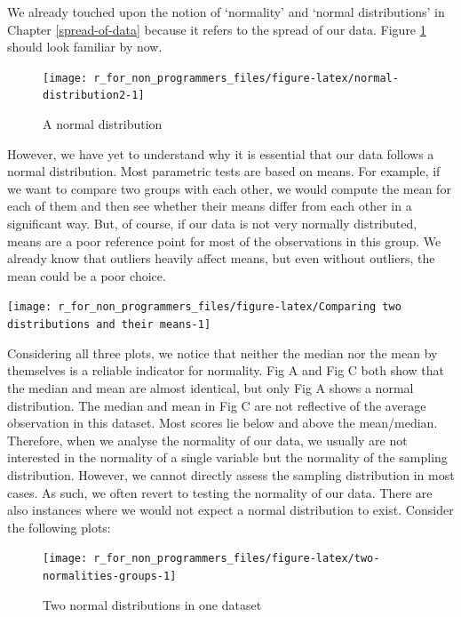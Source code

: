 \documentclass[
]{book}
\begin{document}
We already touched upon the notion of `normality' and `normal distributions' in Chapter \ref{spread-of-data} because it refers to the spread of our data. Figure \ref{fig:normal-distribution2} should look familiar by now.

\begin{figure}

{\centering \texttt{[image: r\_for\_non\_programmers\_files/figure-latex/normal-distribution2-1]} 

}

\caption{A normal distribution}\label{fig:normal-distribution2}
\end{figure}

However, we have yet to understand why it is essential that our data follows a normal distribution. Most parametric tests are based on means. For example, if we want to compare two groups with each other, we would compute the mean for each of them and then see whether their means differ from each other in a significant way. But, of course, if our data is not very normally distributed, means are a poor reference point for most of the observations in this group. We already know that outliers heavily affect means, but even without outliers, the mean could be a poor choice.

\begin{center}\texttt{[image: r\_for\_non\_programmers\_files/figure-latex/Comparing two distributions and their means-1]} \end{center}

Considering all three plots, we notice that neither the median nor the mean by themselves is a reliable indicator for normality. Fig A and Fig C both show that the median and mean are almost identical, but only Fig A shows a normal distribution. The median and mean in Fig C are not reflective of the average observation in this dataset. Most scores lie below and above the mean/median. Therefore, when we analyse the normality of our data, we usually are not interested in the normality of a single variable but the normality of the sampling distribution. However, we cannot directly assess the sampling distribution in most cases. As such, we often revert to testing the normality of our data. There are also instances where we would not expect a normal distribution to exist. Consider the following plots:

\begin{figure}

{\centering \texttt{[image: r\_for\_non\_programmers\_files/figure-latex/two-normalities-groups-1]} 

}

\caption{Two normal distributions in one dataset}\label{fig:two-normalities-groups}
\end{figure}
\end{document}
